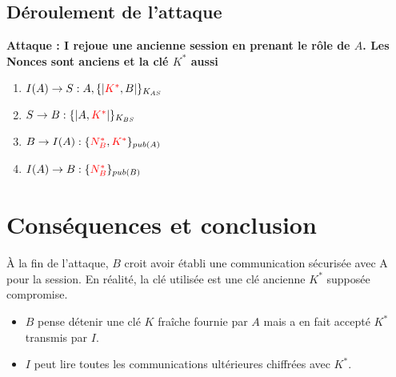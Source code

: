 \documentclass[11pt]{article}
\begin{document}
\subsection{Déroulement de l'attaque}

\textbf{Attaque : I rejoue une ancienne session en prenant le rôle de $A$. Les Nonces sont anciens et la clé $K^*$ aussi}

\begin{enumerate}
    \item $I(A) \rightarrow S : A, \{|\textcolor{red}{K^*},B|\}_{K_{AS}}$
    \item $S \rightarrow B : \{|A,\textcolor{red}{K^*}|\}_{K_{BS}}$
    \item $B \rightarrow I(A) : \{\textcolor{red}{N_B^*},\textcolor{red}{K^*}\}_{pub(A)}$
    \item $I(A) \rightarrow B :  \{\textcolor{red}{N_B^*}\}_{pub(B)}$
\end{enumerate}


\section{Conséquences et conclusion}

\noindent
À la fin de l'attaque, $B$ croit avoir établi une communication sécurisée avec A pour la session. En réalité, la clé utilisée est une clé ancienne $K^*$ supposée compromise.

\begin{itemize}
    \item $B$ pense détenir une clé $K$ fraîche fournie par $A$ mais a en fait accepté $K^*$ transmis par $I$.
    \item $I$ peut lire toutes les communications ultérieures chiffrées avec $K^*$.
\end{itemize}
\end{document}
